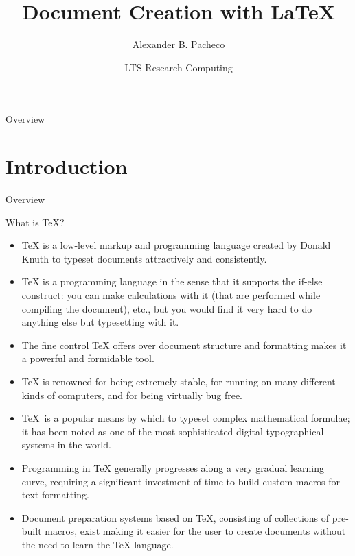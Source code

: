 \documentclass[style=lehigh,orient=landscape]{powerdot}
\title{Document Creation with \LaTeX{}}
\author{Alexander B. Pacheco}
\date{LTS Research Computing}
\begin{document}
\maketitle
\begin{wideslide}[toc=,bm=]{Overview}
  \tableofcontents[content=sections]
\end{wideslide}
\scriptsize

\section[slide=false]{Introduction}
\begin{wideslide}[toc=,bm=]{Overview}
  \tableofcontents[content=currentsection,type=0]
\end{wideslide}
\begin{wideslide}[bm={What is \TeX{} \& \LaTeX?}]{What is \TeX{}?}
  \begin{itemize}
  \item \TeX{} is a low-level markup and programming language created by Donald Knuth to typeset documents attractively and consistently.
  \item \TeX{} is a programming language in the sense that it supports the if-else construct: you can make calculations with it (that are performed while compiling the document), etc., but you would find it very hard to do anything else but typesetting with it.
  \item The fine control \TeX{} offers over document structure and formatting makes it a powerful and formidable tool.
  \item \TeX{} is renowned for being extremely stable, for running on many different kinds of computers, and for being virtually bug free.
  \item \TeX\, is a popular means by which to typeset complex mathematical formulae; it has been noted as one of the most sophisticated digital typographical systems in the world.
  \item Programming in \TeX{} generally progresses along a very gradual learning curve, requiring a significant investment of time to build custom macros for text formatting.
  \item Document preparation systems based on \TeX{}, consisting of collections of pre-built macros, exist making it easier for the user to create documents without the need to learn the \TeX{} language.
  \end{itemize}
\end{wideslide}	
\end{document}
